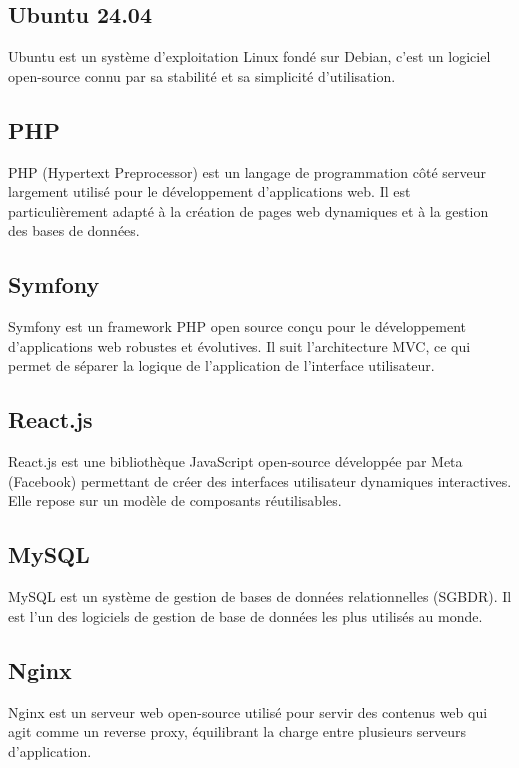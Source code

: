 \begin{enumerate}
\begin{itemize}
\begin{itemize}
\begin{itemize}
\begin{itemize}
\begin{enumerate}
\subsection{Ubuntu 24.04}

Ubuntu est un système d'exploitation Linux fondé sur Debian, c'est un logiciel open-source connu par sa stabilité et sa simplicité d'utilisation.

\subsection{PHP}

PHP (Hypertext Preprocessor) est un langage de programmation côté serveur largement utilisé pour le développement d'applications web. Il est particulièrement adapté à la création de pages web dynamiques et à la gestion des bases de données.

\subsection{Symfony}

Symfony est un framework PHP open source conçu pour le développement d'applications web robustes et évolutives. Il suit l'architecture MVC, ce qui permet de séparer la logique de l'application de l'interface utilisateur.

\subsection{React.js}

React.js est une bibliothèque JavaScript open-source développée par Meta (Facebook) permettant de créer des interfaces utilisateur dynamiques interactives. Elle repose sur un modèle de composants réutilisables.

\subsection{MySQL}

MySQL est un système de gestion de bases de données relationnelles (SGBDR). Il est l'un des logiciels de gestion de base de données les plus utilisés au monde.

\subsection{Nginx}

Nginx est un serveur web open-source utilisé pour servir des contenus web qui agit comme un reverse proxy, équilibrant la charge entre plusieurs serveurs d'application.


\end{enumerate}
\end{itemize}
\end{itemize}
\end{itemize}
\end{itemize}
\end{enumerate}

